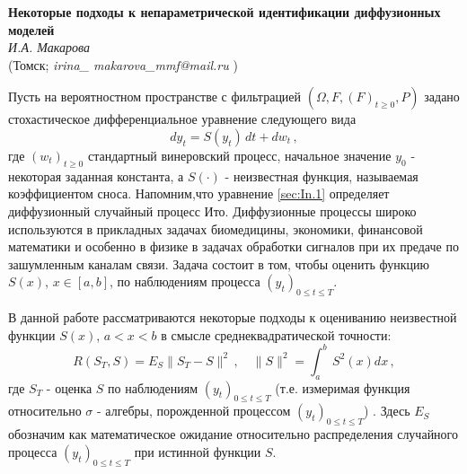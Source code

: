 \begin{center}{ \bf  Некоторые подходы к непараметрической идентификации диффузионных моделей}\\
{\it И.А. Макарова } \\
(Томск; {\it irina\_ makarova\_mmf@mail.ru} )
\end{center}


Пусть на вероятностном пространстве с фильтрацией $(\Omega, F, (F)_{t\ge 0}, P)$ задано стохастическое дифференциальное уравнение следующего вида
 \begin{equation}\label{sec:In.1}
d y_{t}=S(y_{t})\,d t +d w_{t}\,,
 \end{equation}
где $(w_{t})_{t\ge 0}$ стандартный винеровский процесс, начальное значение $y_{0}$ - некоторая заданная константа, а $S(\cdot)$ - неизвестная функция, называемая коэффициентом сноса. Напомним,что уравнение \eqref{sec:In.1} определяет диффузионный случайный процесс Ито.
Диффузионные процессы широко используются в прикладных задачах биомедицины, экономики, финансовой математики и особенно в физике в задачах обработки сигналов при их предаче по зашумленным каналам связи.
Задача состоит в том, чтобы оценить функцию $S(x)$, $x\in[a,b]$, по наблюдениям процесса
$(y_{t})_{0\le t\le T}$.

В данной работе рассматриваются некоторые подходы к оцениванию неизвестной функции $S(x)$, $a<x<b$ в смысле среднеквадратической точности:
\begin{equation}\label{sec:In.2}
R({S}_{T},S)=E_{S}\|{S}_{T}-S\|^2\,,
\quad
\|S\|^2=\int^b_{a}\,S^2(x)d x\,,
\end{equation}
где ${S}_{T}$ - оценка
$S$ по наблюдениям $(y_{t})_{0\le t\le T}$ (т.е. измеримая функция относительно $\sigma$ - алгебры, порожденной процессом $(y_{t})_{0\le t\le T}$) . Здесь $E_{S}$ обозначим как математическое ожидание относительно распределения случайного процесса
 $(y_{t})_{0\le t\le T}$ при истинной функции $S$.

